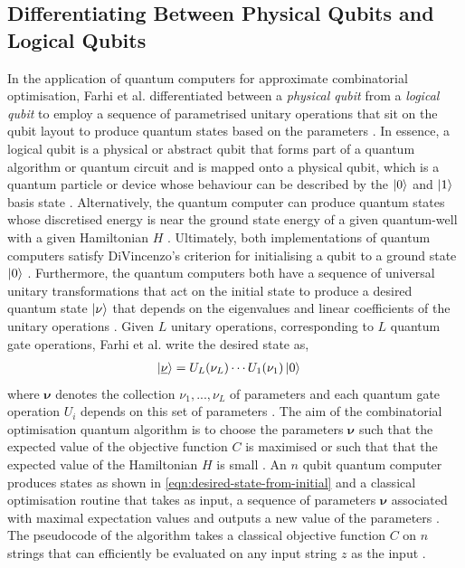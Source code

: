 \subsection{Differentiating Between Physical Qubits and Logical Qubits}

In the application of quantum computers for approximate combinatorial optimisation, Farhi et al. differentiated between a \textit{physical qubit} from a \textit{logical qubit} to employ a sequence of parametrised unitary operations that sit on the qubit layout to produce quantum states based on the parameters  \cite{farhi2017quantum}. In essence, a logical qubit is a physical or abstract qubit that forms part of a quantum algorithm or quantum circuit and is mapped onto a physical qubit, which is a quantum particle or device whose behaviour can be described by the $\ket{0}$ and $\ket{1}$ basis state \cite{zhang2021time}. Alternatively, the quantum computer can produce quantum states whose discretised energy is near the ground state energy of a given quantum-well with a given Hamiltonian $H$ \cite{farhi2017quantum}. Ultimately, both implementations of quantum computers satisfy DiVincenzo's criterion for initialising a qubit to a ground state $\ket{0}$ \cite{farhi2017quantum, divincenzo2000physical}. Furthermore, the quantum computers both have a sequence of universal unitary transformations that act on the initial state to produce a desired quantum state $\ket{\mathbf{\nu}}$ that depends on the eigenvalues and linear coefficients of the unitary operations \cite{farhi2017quantum}. Given $L$ unitary operations, corresponding to $L$ quantum gate operations, Farhi et al. write the desired state as, 
\begin{align}\label{eqn:desired-state-from-initial}
	\ket{\underline{\nu}} & = U_L(\nu_L)\cdots U_1(\nu_1)\ket{0}
\end{align} 
where $\mathbf{\nu}$ denotes the collection $\nu_1,...,\nu_L$ of parameters and each quantum gate operation $U_i$ depends on this set of parameters \cite{farhi2017quantum}. The aim of the combinatorial optimisation quantum algorithm is to choose the parameters $\mathbf{\nu}$ such that the expected value of the objective function $C$ is maximised or such that that the expected value of the Hamiltonian $H$ is small \cite{farhi2017quantum}. An $n$ qubit quantum computer produces states as shown in \ref{eqn:desired-state-from-initial} and a classical optimisation routine that takes as input, a sequence of parameters $\mathbf{\nu}$ associated with maximal expectation values and outputs a new value of the parameters \cite{farhi2017quantum}. The pseudocode of the algorithm takes a classical objective function $C$ on $n$ strings that can efficiently be evaluated on any input string $z$ as the input \cite{farhi2017quantum}. 

